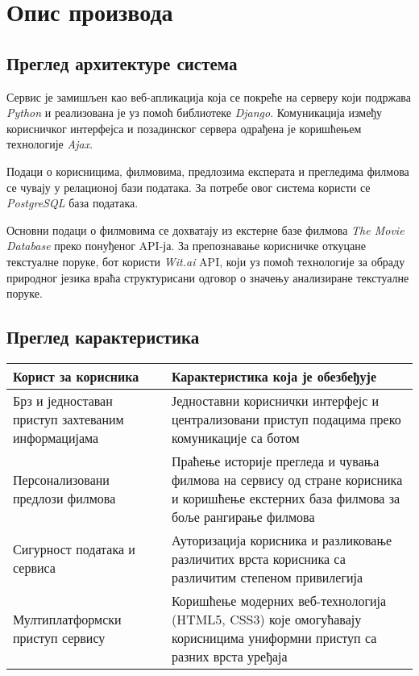 \section{Опис производа}

\subsection{Преглед архитектуре система}

Сервис је замишљен као веб-апликација која се покреће на серверу који подржава \textit{Python} и
реализована је уз помоћ библиотеке \textit{Django}. Комуникација између корисничког интерфејса и
позадинског сервера одрађена је коришћењем технологије \textit{Ajax}.

Подаци о корисницима, филмовима, предлозима експерата и прегледима филмова се чувају у
релационој бази података. За потребе овог система користи се \textit{PostgreSQL} база података.

Основни подаци о филмовима се дохватају из екстерне базе филмова \textit{The Movie Database} преко
понуђеног API-ја. За препознавање корисничке откуцане текстуалне поруке, бот користи \textit{Wit.ai} API,
који уз помоћ технологије за обраду природног језика враћа структурисани одговор о значењу анализиране
текстуалне поруке.

\subsection{Преглед карактеристика}

\noindent
\setcellgapes{4pt}
\makegapedcells
\begin{tabularx}{\linewidth}{|X|X|}
    \hline
    \textbf{Корист за корисника} & \textbf{Карактеристика која је обезбеђује} \\
    \hline
    Брз и једноставан приступ захтеваним информацијама & Једноставни кориснички интерфејс и
    централизовани приступ подацима преко комуникације са ботом \\
    \hline
    Персонализовани предлози филмова & Праћење историје прегледа и чувања филмова на сервису
    од стране корисника и коришћење екстерних база филмова за боље рангирање филмова \\
    \hline
    Сигурност података и сервиса & Ауторизација корисника и разликовање различитих врста
    корисника са различитим степеном привилегија \\
    \hline
    Мултиплатформски приступ сервису & Коришћење модерних веб-технологија (HTML5, CSS3) које
    омогућавају корисницима униформни приступ са разних врста уређаја \\
    \hline
\end{tabularx}
